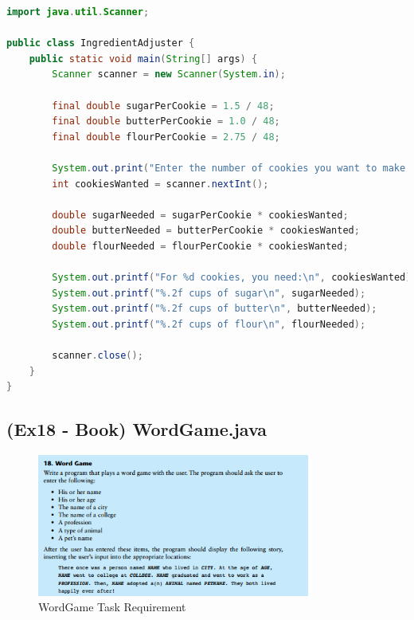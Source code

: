 \documentclass{article}
\begin{document}
\begin{lstlisting}[language=Java, caption=IngredientAdjuster.java]
import java.util.Scanner;

public class IngredientAdjuster {
    public static void main(String[] args) {
        Scanner scanner = new Scanner(System.in);

        final double sugarPerCookie = 1.5 / 48;
        final double butterPerCookie = 1.0 / 48;
        final double flourPerCookie = 2.75 / 48;

        System.out.print("Enter the number of cookies you want to make: ");
        int cookiesWanted = scanner.nextInt();

        double sugarNeeded = sugarPerCookie * cookiesWanted;
        double butterNeeded = butterPerCookie * cookiesWanted;
        double flourNeeded = flourPerCookie * cookiesWanted;

        System.out.printf("For %d cookies, you need:\n", cookiesWanted);
        System.out.printf("%.2f cups of sugar\n", sugarNeeded);
        System.out.printf("%.2f cups of butter\n", butterNeeded);
        System.out.printf("%.2f cups of flour\n", flourNeeded);

        scanner.close();
    }
}
\end{lstlisting}

\subsection*{(Ex18 - Book) WordGame.java}

\begin{figure}[H]
    \centering
    \includegraphics[width=0.8\textwidth]{./Assets/Task requirements/Assignment2/2.18.png}
    \caption{WordGame Task Requirement}
\end{figure}
\end{document}
